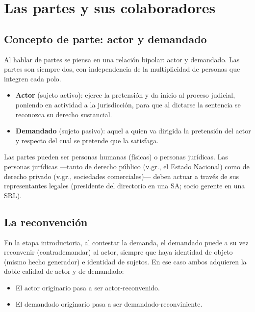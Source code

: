 \documentclass[12pt,oneside]{book}
\begin{document}
\chapter{Las partes y sus colaboradores}

\section{Concepto de parte: actor y demandado}

Al hablar de partes se piensa en una relación bipolar: actor y demandado. Las partes son siempre dos, con independencia de la multiplicidad de personas que integren cada polo.

\begin{itemize}
    \item \textbf{Actor} (sujeto activo): ejerce la pretensión y da inicio al proceso judicial, poniendo en actividad a la jurisdicción, para que al dictarse la sentencia se reconozca su derecho sustancial.
    \item \textbf{Demandado} (sujeto pasivo): aquel a quien va dirigida la pretensión del actor y respecto del cual se pretende que la satisfaga.
\end{itemize}

Las partes pueden ser personas humanas (físicas) o personas jurídicas. Las personas jurídicas —tanto de derecho público (v.gr., el Estado Nacional) como de derecho privado (v.gr., sociedades comerciales)— deben actuar a través de sus representantes legales (presidente del directorio en una SA; socio gerente en una SRL).

\section{La reconvención}

En la etapa introductoria, al contestar la demanda, el demandado puede a su vez reconvenir (contrademandar) al actor, siempre que haya identidad de objeto (mismo hecho generador) e identidad de sujetos. En ese caso ambos adquieren la doble calidad de actor y de demandado:

\begin{itemize}
    \item El actor originario pasa a ser actor-reconvenido.
    \item El demandado originario pasa a ser demandado-reconviniente.
\end{itemize}
\end{document}
